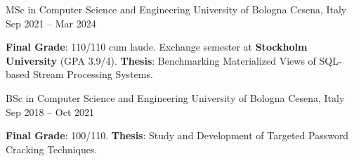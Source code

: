 

\begin{cventries}

\cventry
{MSc in Computer Science and Engineering} %
{University of Bologna} %
{Cesena, Italy} %
{Sep 2021 – Mar 2024} %
{
  \begin{cvitems} %
    \item {\textbf{Final Grade}: 110/110 cum laude. Exchange semester at \textbf{Stockholm University} (GPA 3.9/4). \textbf{Thesis}: Benchmarking Materialized Views of SQL-based Stream Processing Systems.}
  \end{cvitems}
}

\cventry
{BSc in Computer Science and Engineering} %
{University of Bologna} %
{Cesena, Italy} %
{Sep 2018 – Oct 2021} %
{
  \begin{cvitems} %
    \item {\textbf{Final Grade}: 100/110. \textbf{Thesis}: Study and Development of Targeted Password Cracking Techniques.}
  \end{cvitems}
}

\end{cventries}

